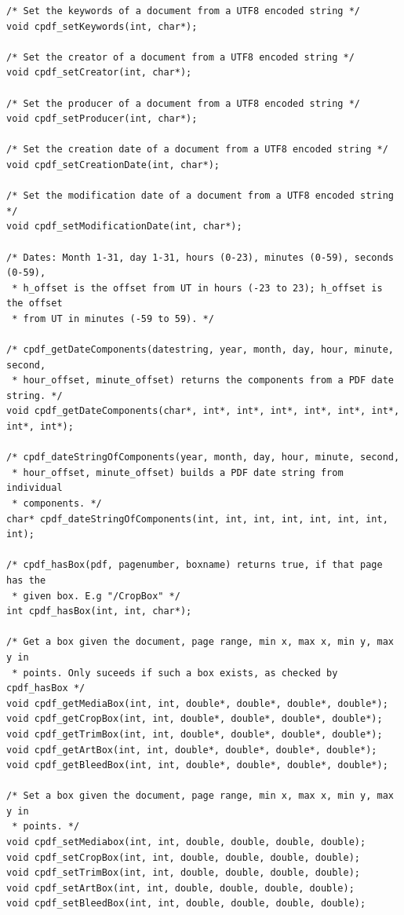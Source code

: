 \documentclass[a4paper]{memoir}
\begin{document}
\begin{small}
\begin{lstlisting}
/* Set the keywords of a document from a UTF8 encoded string */
void cpdf_setKeywords(int, char*);

/* Set the creator of a document from a UTF8 encoded string */
void cpdf_setCreator(int, char*);

/* Set the producer of a document from a UTF8 encoded string */
void cpdf_setProducer(int, char*);

/* Set the creation date of a document from a UTF8 encoded string */
void cpdf_setCreationDate(int, char*);

/* Set the modification date of a document from a UTF8 encoded string */
void cpdf_setModificationDate(int, char*);

/* Dates: Month 1-31, day 1-31, hours (0-23), minutes (0-59), seconds (0-59),
 * h_offset is the offset from UT in hours (-23 to 23); h_offset is the offset
 * from UT in minutes (-59 to 59). */

/* cpdf_getDateComponents(datestring, year, month, day, hour, minute, second,
 * hour_offset, minute_offset) returns the components from a PDF date string. */
void cpdf_getDateComponents(char*, int*, int*, int*, int*, int*, int*, int*, int*);

/* cpdf_dateStringOfComponents(year, month, day, hour, minute, second,
 * hour_offset, minute_offset) builds a PDF date string from individual
 * components. */
char* cpdf_dateStringOfComponents(int, int, int, int, int, int, int, int);

/* cpdf_hasBox(pdf, pagenumber, boxname) returns true, if that page has the
 * given box. E.g "/CropBox" */
int cpdf_hasBox(int, int, char*);

/* Get a box given the document, page range, min x, max x, min y, max y in
 * points. Only suceeds if such a box exists, as checked by cpdf_hasBox */
void cpdf_getMediaBox(int, int, double*, double*, double*, double*);
void cpdf_getCropBox(int, int, double*, double*, double*, double*);
void cpdf_getTrimBox(int, int, double*, double*, double*, double*);
void cpdf_getArtBox(int, int, double*, double*, double*, double*);
void cpdf_getBleedBox(int, int, double*, double*, double*, double*);

/* Set a box given the document, page range, min x, max x, min y, max y in
 * points. */
void cpdf_setMediabox(int, int, double, double, double, double);
void cpdf_setCropBox(int, int, double, double, double, double);
void cpdf_setTrimBox(int, int, double, double, double, double);
void cpdf_setArtBox(int, int, double, double, double, double);
void cpdf_setBleedBox(int, int, double, double, double, double);


\end{lstlisting}
\end{small}
\end{document}
